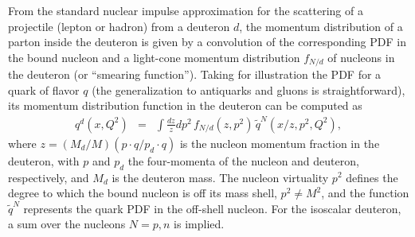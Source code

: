 \documentclass[aps,prd,amsmath,preprint]{revtex4}
\begin{document}
From the standard nuclear impulse approximation for the scattering
of a projectile (lepton or hadron) from a deuteron $d$, the
momentum distribution of a parton inside the deuteron is given by
a convolution of the corresponding PDF in the bound nucleon and a
light-cone momentum distribution $f_{N/d}$ of nucleons in the
deuteron (or ``smearing function'').
Taking for illustration the PDF for a quark of flavor $q$ (the
generalization to antiquarks and gluons is straightforward),
its momentum distribution function in the deuteron can be
computed as \cite{MSToff, KPW94}
%
\begin{eqnarray}
q^d(x,Q^2)
&=& \int \frac{dz}{z} dp^2\,
    f_{N/d}(z,p^2)\, \widetilde{q}^N(x/z,p^2,Q^2),
\label{eq:genconv}
\end{eqnarray}
%
where $z = (M_d/M)(p \cdot q / p_d \cdot q)$ is the nucleon momentum
fraction in the deuteron, with $p$ and $p_d$ the four-momenta of the
nucleon and deuteron, respectively, and $M_d$ is the deuteron mass.
The nucleon virtuality $p^2$ defines the degree to which the bound
nucleon is off its mass shell, $p^2 \neq M^2$, and the function
$\widetilde{q}^N$ represents the quark PDF in the off-shell nucleon.
For the isoscalar deuteron, a sum over the nucleons $N = p, n$ is
implied.
\end{document}
